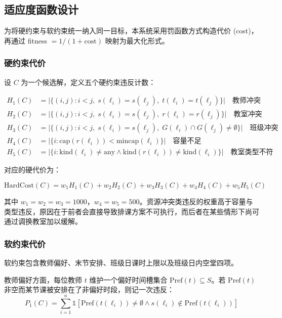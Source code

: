 \subsection{适应度函数设计}

为将硬约束与软约束统一纳入同一目标，本系统采用罚函数方式构造代价 (cost)，再通过 fitness $= 1/(1+\text{cost})$ 映射为最大化形式。

\subsubsection{硬约束代价}

设 $C$ 为一个候选解，定义五个硬约束违反计数：

\begin{align}
H_1(C) &= \big|\{(i,j) : i < j,\; s(\ell_i) = s(\ell_j),\; t(\ell_i) = t(\ell_j)\}\big| \quad \text{教师冲突} \\
H_2(C) &= \big|\{(i,j) : i < j,\; s(\ell_i) = s(\ell_j),\; r(\ell_i) = r(\ell_j)\}\big| \quad \text{教室冲突} \\
H_3(C) &= \big|\{(i,j) : i < j,\; s(\ell_i) = s(\ell_j),\; G(\ell_i) \cap G(\ell_j) \neq \emptyset\}\big| \quad \text{班级冲突} \\
H_4(C) &= \big|\{i : \mathrm{cap}(r(\ell_i)) < \mathrm{mincap}(\ell_i)\}\big| \quad \text{容量不足} \\
H_5(C) &= \big|\{i : \mathrm{kind}(\ell_i) \neq \text{any} \wedge \mathrm{kind}(r(\ell_i)) \neq \mathrm{kind}(\ell_i)\}\big| \quad \text{教室类型不符}
\end{align}

对应的硬代价为：

\begin{equation}
  \mathrm{HardCost}(C) = w_1 H_1(C) + w_2 H_2(C) + w_3 H_3(C) + w_4 H_4(C) + w_5 H_5(C)
\end{equation}

其中 $w_1 = w_2 = w_3 = 1000$，$w_4 = w_5 = 500$。资源冲突类违反的权重高于容量与类型违反，原因在于前者会直接导致排课方案不可执行，而后者在某些情形下尚可通过调换教室加以缓解。

\subsubsection{软约束代价}

软约束包含教师偏好、末节安排、班级日课时上限以及班级日内空堂四项。

教师偏好方面，每位教师 $t$ 维护一个偏好时间槽集合 $\mathrm{Pref}(t) \subseteq S$。若 $\mathrm{Pref}(t)$ 非空而某节课被安排在了非偏好时段，则记一次违反：
\begin{equation}
  P_1(C) = \sum_{i=1}^{n} \mathbb{1}[\mathrm{Pref}(t(\ell_i)) \neq \emptyset \wedge s(\ell_i) \notin \mathrm{Pref}(t(\ell_i))]
\end{equation}

